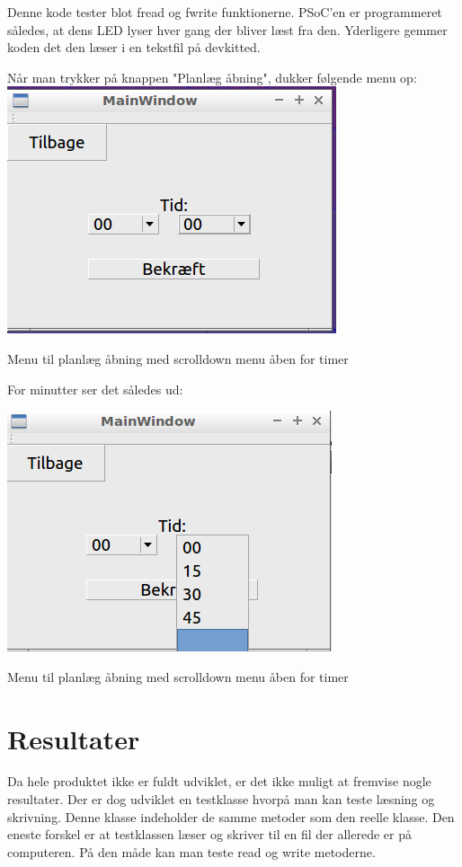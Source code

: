 Denne kode tester blot fread og fwrite funktionerne. PSoC'en er programmeret således, at dens LED lyser hver gang der bliver læst fra den. Yderligere gemmer koden det den læser i en tekstfil på devkitted.

Når man trykker på knappen "Planlæg åbning", dukker følgende menu op:
\includegraphics{Billeder/paMin}
\caption{Menu til planlæg åbning med scrolldown menu åben for timer}

For minutter ser det således ud:

\includegraphics{Billeder/paMinutter}
\caption{Menu til planlæg åbning med scrolldown menu åben for timer}

\section*{Resultater}

Da hele produktet ikke er fuldt udviklet, er det ikke muligt at fremvise nogle resultater. Der er dog udviklet en testklasse hvorpå man kan teste læsning og skrivning. Denne klasse indeholder de samme metoder som den reelle klasse. Den eneste forskel er at testklassen læser og skriver til en fil der allerede er på computeren. På den måde kan man teste read og write metoderne.

